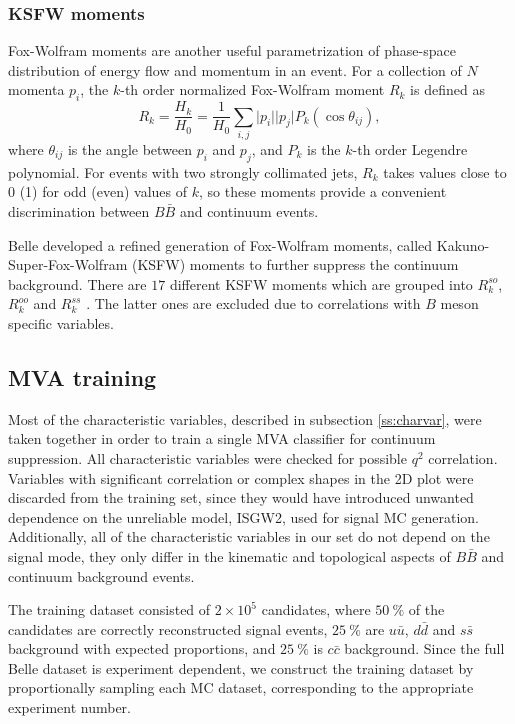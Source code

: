 \documentclass[headings=standardclasses,headings=big,oneside,a4paper,openany,12pt]{scrbook}
\newcommand {\E}[1]{\times 10^{#1}}
\begin{document}
\subsubsection{KSFW moments}
Fox-Wolfram moments are another useful parametrization of phase-space distribution of energy flow and momentum in an event. For a collection of $N$ momenta $p_i$, the $k$-th order normalized Fox-Wolfram moment $R_k$ is defined as
\begin{equation}
R_k = \frac{H_k}{H_0} = \frac{1}{H_0} \sum_{i,j} \vert p_i \vert \vert p_j \vert P_k(\cos \theta_{ij}),
\end{equation}
where $\theta_{ij}$ is the angle between $p_i$ and $p_j$, and $P_k$ is the $k$-th order Legendre polynomial. For events with two strongly collimated jets, $R_k$ takes values close to 0 (1) for odd (even) values of $k$, so these moments provide a convenient discrimination between $B \bar B$ and continuum events.

Belle developed a refined generation of Fox-Wolfram moments, called Kakuno-Super-Fox-Wolfram (KSFW) moments to further suppress the continuum background. There are $17$  different KSFW moments which are grouped into $R^{so}_k$, $R^{oo}_k$ and $R^{ss}_k$ \cite{bevan2014physics}. The latter ones are excluded due to correlations with $B$ meson specific variables.

\subsection{MVA training}
\label{ss:qqmva}
Most of the characteristic variables, described in subsection \ref{ss:charvar}, were taken together in order to train a single MVA classifier for continuum suppression. All characteristic variables were checked for possible $q^2$ correlation. Variables with significant correlation or complex shapes in the 2D plot were discarded from the training set, since they would have introduced unwanted dependence on the unreliable model, ISGW2, used for signal MC generation. Additionally, all of the characteristic variables in our set do not depend on the signal mode, they only differ in the kinematic and topological aspects of $B \bar B$ and continuum background events.

The training dataset consisted of $2\E5$ candidates, where $50~\%$ of the candidates are correctly reconstructed signal events, $25~\%$ are $u \bar u$, $d \bar d$ and $s \bar s$ background with expected proportions, and $25~\%$ is $c \bar c$ background. Since the full Belle dataset is experiment dependent, we construct the training dataset by proportionally sampling each MC dataset, corresponding to the appropriate experiment number.
\end{document}
